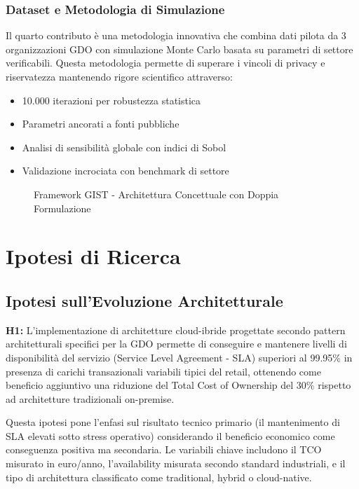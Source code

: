 \subsubsection{Dataset e Metodologia di Simulazione}

Il quarto contributo è una metodologia innovativa che combina dati pilota da 3 organizzazioni GDO con simulazione Monte Carlo basata su parametri di settore verificabili. Questa metodologia permette di superare i vincoli di privacy e riservatezza mantenendo rigore scientifico attraverso:
\begin{itemize}
\item 10.000 iterazioni per robustezza statistica
\item Parametri ancorati a fonti pubbliche
\item Analisi di sensibilità globale con indici di Sobol
\item Validazione incrociata con benchmark di settore
\end{itemize}

\begin{figure}[H]
\centering
{}
\caption{Framework GIST - Architettura Concettuale con Doppia Formulazione}
\end{figure}

\section{Ipotesi di Ricerca}

\subsection{Ipotesi sull'Evoluzione Architetturale}

\textbf{H1:} L'implementazione di architetture cloud-ibride progettate secondo pattern architetturali specifici per la GDO permette di conseguire e mantenere livelli di disponibilità del servizio (Service Level Agreement - SLA) superiori al 99.95\% in presenza di carichi transazionali variabili tipici del retail, ottenendo come beneficio aggiuntivo una riduzione del Total Cost of Ownership del 30\% rispetto ad architetture tradizionali on-premise.

Questa ipotesi pone l'enfasi sul risultato tecnico primario (il mantenimento di SLA elevati sotto stress operativo) considerando il beneficio economico come conseguenza positiva ma secondaria. Le variabili chiave includono il TCO misurato in euro/anno, l'availability misurata secondo standard industriali, e il tipo di architettura classificato come traditional, hybrid o cloud-native.

